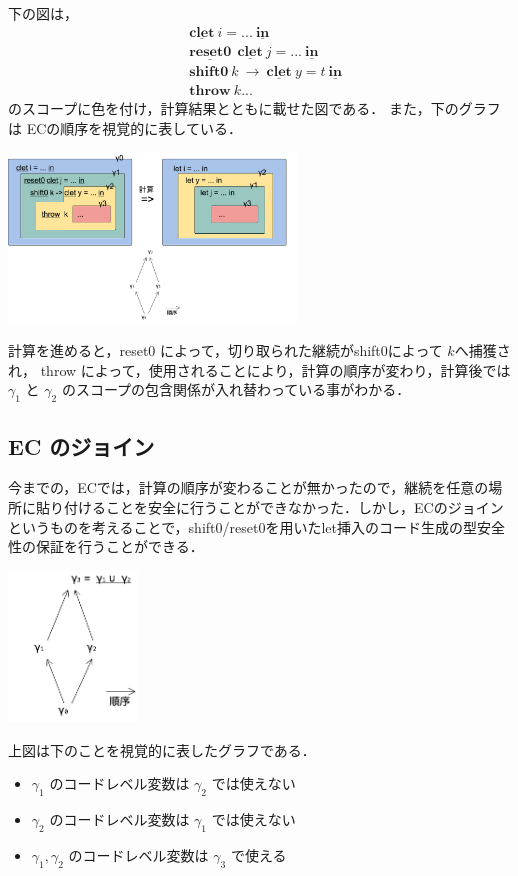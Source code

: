 \documentclass[10pt,a4j,twocolumn]{jarticle}
\newcommand\Shiftz{\textbf{shift0}}
\newcommand\Throw{\textbf{throw}}
\newcommand\cResetz{\underline{\textbf{reset0}}}
\newcommand\cLet{\underline{\textbf{clet}}}
\newcommand\cIn{\underline{\textbf{in}}}
\theoremstyle{definition}
\begin{document}
下の図は，
\begin{align*}
  & \cLet~ i = ...~\cIn \\
  & \cResetz ~~\cLet~ j = ...~\cIn \\
  & \Shiftz~ k~ \to~ \cLet~y=t~\cIn \\
  & \Throw~ k ...
\end{align*}
のスコープに色を付け，計算結果とともに載せた図である．
また，下のグラフは ECの順序を視覚的に表している．

\begin{center}
  \includegraphics[clip,height=4.5cm]{../img/resume_ecex.png}
\end{center}
計算を進めると，reset0 によって，切り取られた継続がshift0によって $k$へ捕獲され， throw によって，使用されることにより，計算の順序が変わり，計算後では$\gamma_1$ と $\gamma_2$ のスコープの包含関係が入れ替わっている事がわかる．

\subsection{EC のジョイン}
今までの，ECでは，計算の順序が変わることが無かったので，継続を任意の場所に貼り付けることを安全に行うことができなかった．しかし，ECのジョインというものを考えることで，shift0/reset0を用いたlet挿入のコード生成の型安全性の保証を行うことができる．

\begin{center}
  \includegraphics[clip,height=4cm]{../img/ecgraph.png}
\end{center}

上図は下のことを視覚的に表したグラフである．
\begin{itemize}
\item $\gamma_1$ のコードレベル変数は $\gamma_2$ では使えない
\item $\gamma_2$ のコードレベル変数は $\gamma_1$ では使えない
\item $\gamma_1, \gamma_2$ のコードレベル変数は $\gamma_3$ で使える
\end{itemize}
\end{document}
